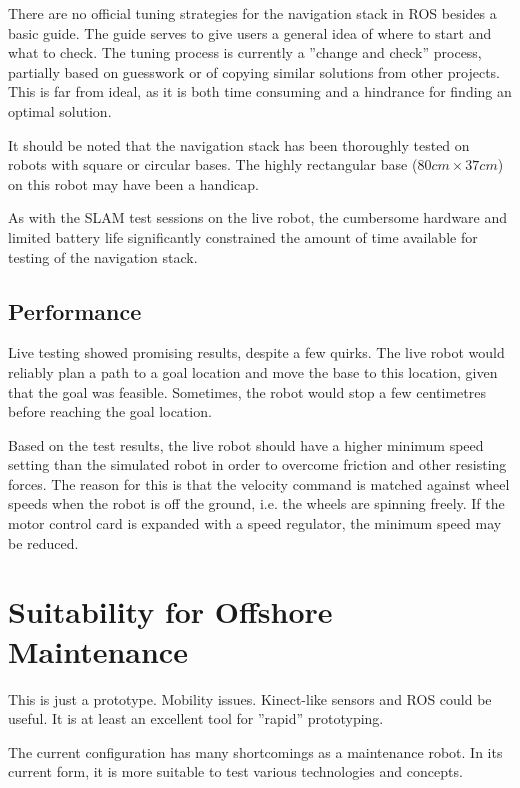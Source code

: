 There are no official tuning strategies for the navigation stack in \ac{ROS} besides a basic guide. The guide serves to give users a general idea of where to start and what to check\cite{ROS_navigation_tuning}. The tuning process is currently a ''change and check'' process, partially based on guesswork or of copying similar solutions from other projects. This is far from ideal, as it is both time consuming and a hindrance for finding an optimal solution. 

It should be noted that the navigation stack has been thoroughly tested on robots with square or circular bases. The highly rectangular base ($80cm \times 37cm$) on this robot may have been a handicap. 



As with the \ac{SLAM} test sessions on the live robot, the cumbersome hardware and limited battery life significantly constrained the amount of time available for testing of the navigation stack. 



\subsection{Performance}

Live testing showed promising results, despite a few quirks. The live robot would reliably plan a path to a goal location and move the base to this location, given that the goal was feasible. Sometimes, the robot would stop a few centimetres before reaching the goal location.

Based on the test results, the live robot should have a higher minimum speed setting than the simulated robot in order to overcome friction and other resisting forces. The reason for this is that the velocity command is matched against wheel speeds when the robot is off the ground, i.e. the wheels are spinning freely. If the motor control card is expanded with a speed regulator, the minimum speed may be reduced.

\section{Suitability for Offshore Maintenance}

This is just a prototype. Mobility issues.
Kinect-like sensors and ROS could be useful. It is at least an excellent tool for ''rapid'' prototyping.

The current configuration has many shortcomings as a maintenance robot. In its current form, it is more suitable to test various technologies and concepts. 

